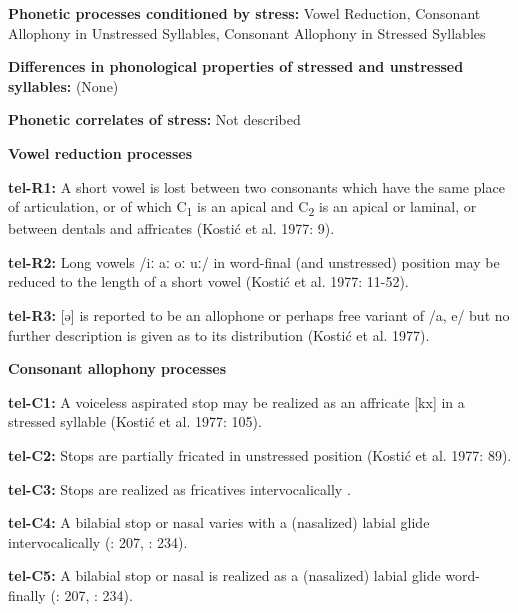\textbf{Phonetic processes conditioned by stress:} Vowel Reduction, Consonant Allophony in Unstressed Syllables, Consonant Allophony in Stressed Syllables



\textbf{Differences in phonological properties of stressed and unstressed syllables:} (None)



\textbf{Phonetic correlates of stress:} Not described



\textbf{Vowel reduction processes}



\textbf{tel-R1:} A short vowel is lost between two consonants which have the same place of articulation, or of which C\textsubscript{1} is an apical and C\textsubscript{2} is an apical or laminal, or between dentals and affricates (Kostić et al. 1977: 9).



\textbf{tel-R2:} Long vowels /iː aː oː uː/ in word-final (and unstressed) position may be reduced to the length of a short vowel (Kostić et al. 1977: 11-52).



\textbf{tel-R3:} [ə] is reported to be an allophone or perhaps free variant of /a, e/ but no further description is given as to its distribution (Kostić et al. 1977).



\textbf{Consonant allophony processes}



\textbf{tel-C1:} A voiceless aspirated stop may be realized as an affricate [kx] in a stressed syllable (Kostić et al. 1977: 105).



\textbf{tel-C2:} Stops are partially fricated in unstressed position (Kostić et al. 1977: 89).



\textbf{tel-C3:} Stops are realized as fricatives intervocalically \citep[207]{Krishnamurti1998}.



\textbf{tel-C4:} A bilabial stop or nasal varies with a (nasalized) labial glide intervocalically (\citealt{Krishnamurti1998}: 207, \citealt{BhaskararaoRay2017}: 234).



\textbf{tel-C5:} A bilabial stop or nasal is realized as a (nasalized) labial glide word-finally (\citealt{Krishnamurti1998}: 207, \citealt{BhaskararaoRay2017}: 234).



